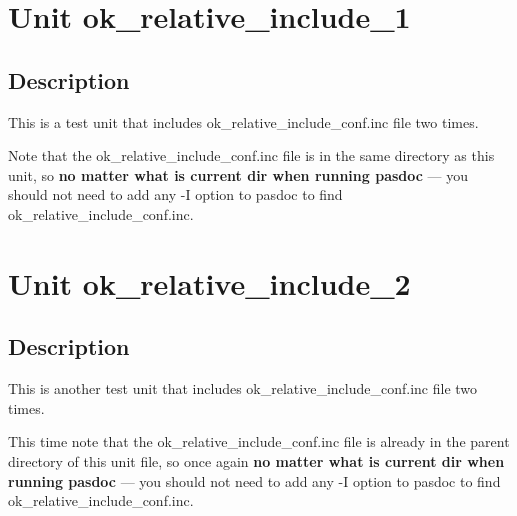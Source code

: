 \documentclass{report}
\begin{document}
\newlength{\tmplength}
\chapter{Unit ok{\_}relative{\_}include{\_}1}
\section{Description}
This is a test unit that includes ok{\_}relative{\_}include{\_}conf.inc file two times.

Note that the ok{\_}relative{\_}include{\_}conf.inc file is in the same directory as this unit, so \textbf{no matter what is current dir when running pasdoc} --- you should not need to add any {-}I option to pasdoc to find ok{\_}relative{\_}include{\_}conf.inc.
\chapter{Unit ok{\_}relative{\_}include{\_}2}
\section{Description}
This is another test unit that includes ok{\_}relative{\_}include{\_}conf.inc file two times.

This time note that the ok{\_}relative{\_}include{\_}conf.inc file is already in the parent directory of this unit file, so once again \textbf{no matter what is current dir when running pasdoc} --- you should not need to add any {-}I option to pasdoc to find ok{\_}relative{\_}include{\_}conf.inc.
\end{document}
